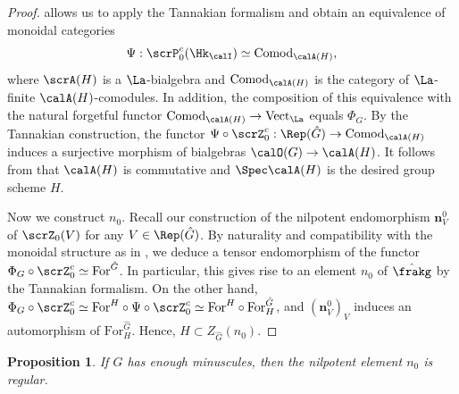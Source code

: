\documentclass[10pt, reqno]{amsart}
\theoremstyle{plain}
\newtheorem{proposition}[theorem]{Proposition}
\theoremstyle{definition}
\numberwithin{equation}{section}
\begin{document}
\begin{proof}
	 allows us to apply the Tannakian formalism and obtain an equivalence of monoidal categories
	\begin{equation}
		\Psi:\scrP_0^c(\Hk_{\calI})\simeq \mathrm{Comod}_{\calA(H)},
	\end{equation}
	where $\scrA(H)$ is a $\La$-bialgebra and $\mathrm{Comod}_{\calA(H)}$ is the category of $\La$-finite $\calA(H)$-comodules. In addition, the composition of this equivalence with the natural forgetful functor $\mathrm{Comod}_{\calA(H)}\rightarrow \mathrm{Vect}_{\La}$ equals $\Phi_G$. By the Tannakian construction, the functor $\Psi\circ \scrZ^c_0:\Rep(\hat{G})\rightarrow\mathrm{Comod}_{\calA(H)}$ induces a surjective morphism of bialgebras $\calO(G)\rightarrow \calA(H)$. It follows from \cite[Lemma 3]{Bez04} that $\calA(H)$ is commutative and $\Spec \calA(H)$ is the desired group scheme $H$.

	
	Now we construct $n_0$. Recall our construction of the nilpotent endomorphism $\mathbf{n}_V^0$ of $\scrZ_0(V)$ for any ${V\in\Rep(\hat{G})}$. By naturality and compatibility with the monoidal structure as in , we deduce a tensor endomorphism of the functor $\Phi_G\circ\scrZ_0^c\simeq\mathrm{For}^{\hat{G}}$. 
	In particular, this gives rise to an element $n_0$ of $\hat{\frakg}$ by the Tannakian formalism. On the other hand, $\Phi_G\circ\scrZ^c_0\simeq \mathrm{For}^{H}\circ \Psi\circ\scrZ^c_0\simeq \mathrm{For}^{H}\circ\mathrm{For}^{\hat{G}}_H $, and $(\mathbf{n}_V^0)_V$ induces an automorphism of $\mathrm{For}^{\hat{G}}_H$. Hence, $H\subset Z_{\hat{G}}(n_0)$.
\end{proof}

\begin{proposition}
	If $G$ has enough minuscules, then the nilpotent element $n_0$ is regular.
\end{proposition}
\end{document}
